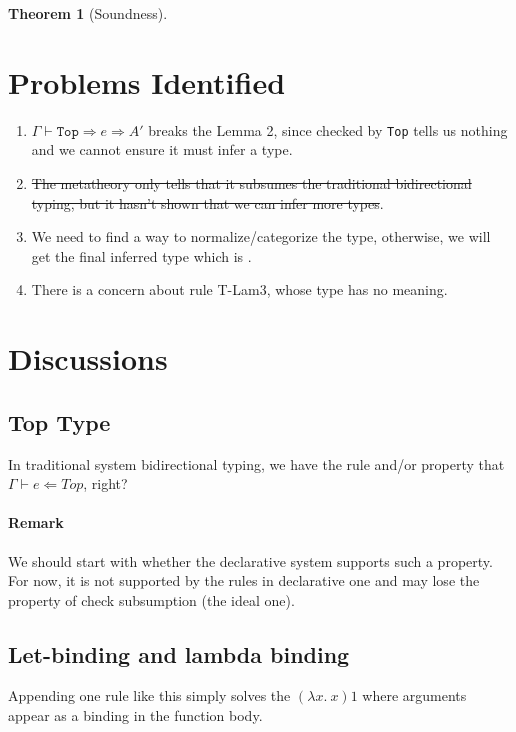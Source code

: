 \documentclass{article}
\newtheorem{theorem}{Theorem}
\begin{document}
\begin{theorem}[Soundness]

\end{theorem}



\section{Problems Identified}

\begin{enumerate}
	\item $\Gamma \vdash \mathtt{Top} \Rightarrow e \Rightarrow A'$ breaks the Lemma 2, since checked by \texttt{Top} tells us nothing and we cannot ensure it must infer a type.
	\item \st{The metatheory only tells that it subsumes the traditional bidirectional typing, but it hasn't shown that we can infer more types}.
	\item We need to find a way to normalize/categorize the type, otherwise, we will get the final inferred type which is .
	\item There is a concern about rule T-Lam3, whose type has no meaning.
\end{enumerate}

\section{Discussions}

\subsection{Top Type}
In traditional system bidirectional typing, we have the rule and/or property that $\Gamma \vdash e \Leftarrow Top$, right?

\paragraph{Remark} We should start with whether the declarative system supports such a property. For now, it is not supported by the rules in declarative one and may lose the property of check subsumption (the ideal one). 

\subsection{Let-binding and lambda binding}

Appending one rule like this simply solves the $(\lambda x .~x) 1$ where arguments appear as a binding in the function body.
\end{document}
